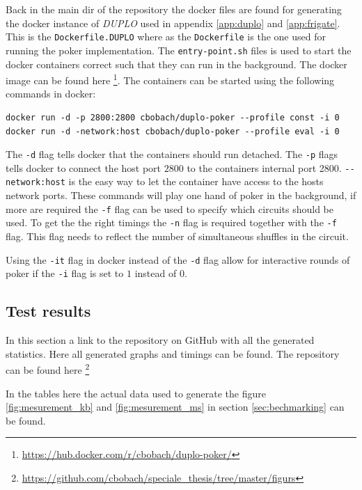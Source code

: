 \documentclass[twoside,11pt,openright]{report}
\newcommand{\DUPLO}{\textit{DUPLO} }
\begin{document}
\begin{appendices}
\bigskip

Back in the main dir of the repository the docker files are found for generating the docker instance of \DUPLO used in appendix \ref{app:duplo} and \ref{app:frigate}. This is the \verb|Dockerfile.DUPLO| where as the \verb|Dockerfile| is the one used for running the poker implementation. The \verb|entry-point.sh| files is used to start the docker containers correct such that they can run in the background. The docker image can be found here \footnote{\url{https://hub.docker.com/r/cbobach/duplo-poker/}}. The containers can be started using the following commands in docker:

\begin{center}
\begin{verbatim}
docker run -d -p 2800:2800 cbobach/duplo-poker --profile const -i 0
docker run -d -network:host cbobach/duplo-poker --profile eval -i 0
\end{verbatim}
\end{center}

The \verb|-d| flag tells docker that the containers should run detached. The \verb|-p| flags tells docker to connect the host port $2800$ to the containers internal port 2800. \verb|--network:host| is the easy way to let the container have access to the hosts network ports. These commands will play one hand of poker in the background, if more are required the \verb|-f| flag can be used to specify which circuits should be used. To get the the right timings the \verb|-n| flag is required together with the \verb|-f| flag. This flag needs to reflect the number of simultaneous shuffles in the circuit.

Using the \verb|-it| flag in docker instead of the \verb|-d| flag allow for interactive rounds of poker if the \verb|-i| flag is set to $1$ instead of $0$.


\subsection{Test results}
\label{app:test-res}
In this section a link to the repository on GitHub with all the generated statistics. Here all generated graphs and timings can be found. The repository can be found here \footnote{\url{https://github.com/cbobach/speciale_thesis/tree/master/figurs}}

\bigskip

In the tables here the actual data used to generate the figure \ref{fig:mesurement_kb} and \ref{fig:mesurement_ms} in section \ref{sec:bechmarking} can be found.


\end{appendices}
\end{document}
